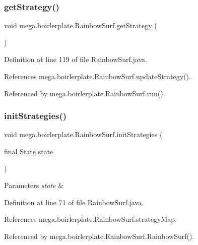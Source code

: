 \subsubsection{\texorpdfstring{get\+Strategy()}{getStrategy()}}
{\footnotesize\ttfamily void mega.\+boirlerplate.\+Rainbow\+Surf.\+get\+Strategy (\begin{DoxyParamCaption}{ }\end{DoxyParamCaption})}



Definition at line 119 of file Rainbow\+Surf.\+java.



References mega.\+boirlerplate.\+Rainbow\+Surf.\+update\+Strategy().



Referenced by mega.\+boirlerplate.\+Rainbow\+Surf.\+run().

\mbox{\label{classmega_1_1boirlerplate_1_1_rainbow_surf_ad4cef06e05fa5e2455028414b99b1eda}} 
\subsubsection{\texorpdfstring{init\+Strategies()}{initStrategies()}}
{\footnotesize\ttfamily void mega.\+boirlerplate.\+Rainbow\+Surf.\+init\+Strategies (\begin{DoxyParamCaption}\item[{final \hyperlink{classmega_1_1boirlerplate_1_1_state}{State}}]{state }\end{DoxyParamCaption})\hspace{0.3cm}{\ttfamily [private]}}


\begin{DoxyParams}{Parameters}
{\em state} & \\
\hline
\end{DoxyParams}


Definition at line 71 of file Rainbow\+Surf.\+java.



References mega.\+boirlerplate.\+Rainbow\+Surf.\+strategy\+Map.



Referenced by mega.\+boirlerplate.\+Rainbow\+Surf.\+Rainbow\+Surf().

